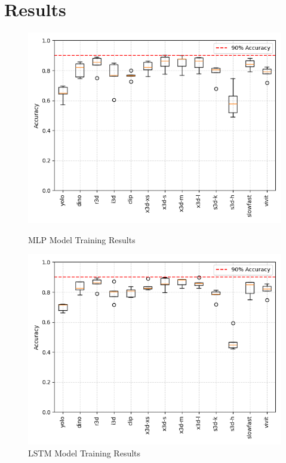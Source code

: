 \section{Results}



\begin{figure}[!htb]
    \centering
    \begin{minipage}{0.48\textwidth}
        \centering
        \includegraphics[width=1\textwidth]{../../assets/figures/mlp.training-results.boxplot.png}
        \caption{MLP Model Training Results}
        \label{fig:mlp-training-results}
    \end{minipage}
    \hfill
    \begin{minipage}{0.48\textwidth}
        \centering
        \includegraphics[width=1\textwidth]{../../assets/figures/lstm.training-results.boxplot.png}
        \caption{LSTM Model Training Results}
        \label{fig:lstm-training-results}
    \end{minipage}
\end{figure}

